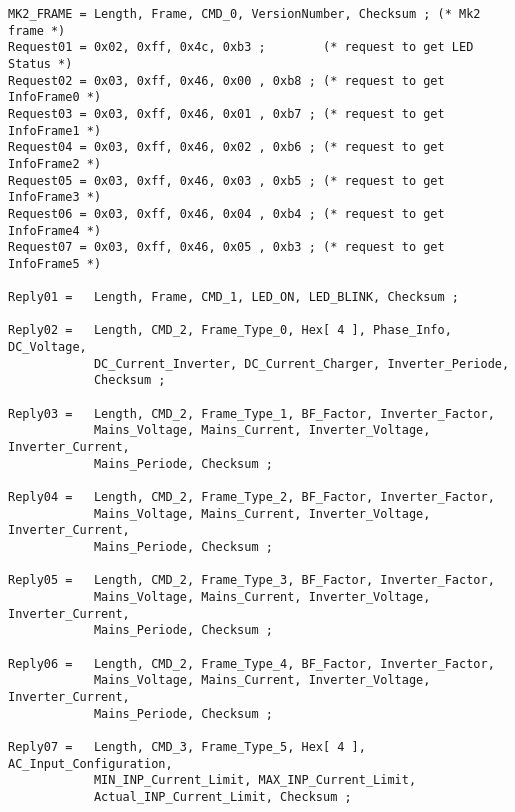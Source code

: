 \begin{verbatim}
MK2_FRAME = Length, Frame, CMD_0, VersionNumber, Checksum ; (* Mk2 frame *)
Request01 = 0x02, 0xff, 0x4c, 0xb3 ;        (* request to get LED Status *)
Request02 = 0x03, 0xff, 0x46, 0x00 , 0xb8 ; (* request to get InfoFrame0 *)
Request03 = 0x03, 0xff, 0x46, 0x01 , 0xb7 ; (* request to get InfoFrame1 *)
Request04 = 0x03, 0xff, 0x46, 0x02 , 0xb6 ; (* request to get InfoFrame2 *)
Request05 = 0x03, 0xff, 0x46, 0x03 , 0xb5 ; (* request to get InfoFrame3 *)
Request06 = 0x03, 0xff, 0x46, 0x04 , 0xb4 ; (* request to get InfoFrame4 *)
Request07 = 0x03, 0xff, 0x46, 0x05 , 0xb3 ; (* request to get InfoFrame5 *)

Reply01 =   Length, Frame, CMD_1, LED_ON, LED_BLINK, Checksum ;

Reply02 =   Length, CMD_2, Frame_Type_0, Hex[ 4 ], Phase_Info, DC_Voltage, 
            DC_Current_Inverter, DC_Current_Charger, Inverter_Periode, 
            Checksum ;
             
Reply03 =   Length, CMD_2, Frame_Type_1, BF_Factor, Inverter_Factor, 
            Mains_Voltage, Mains_Current, Inverter_Voltage, Inverter_Current,
            Mains_Periode, Checksum ;
             
Reply04 =   Length, CMD_2, Frame_Type_2, BF_Factor, Inverter_Factor, 
            Mains_Voltage, Mains_Current, Inverter_Voltage, Inverter_Current,
            Mains_Periode, Checksum ;
             
Reply05 =   Length, CMD_2, Frame_Type_3, BF_Factor, Inverter_Factor, 
            Mains_Voltage, Mains_Current, Inverter_Voltage, Inverter_Current,
            Mains_Periode, Checksum ;
             
Reply06 =   Length, CMD_2, Frame_Type_4, BF_Factor, Inverter_Factor, 
            Mains_Voltage, Mains_Current, Inverter_Voltage, Inverter_Current,
            Mains_Periode, Checksum ;
             
Reply07 =   Length, CMD_3, Frame_Type_5, Hex[ 4 ], AC_Input_Configuration, 
            MIN_INP_Current_Limit, MAX_INP_Current_Limit, 
            Actual_INP_Current_Limit, Checksum ;
\end{verbatim} 


